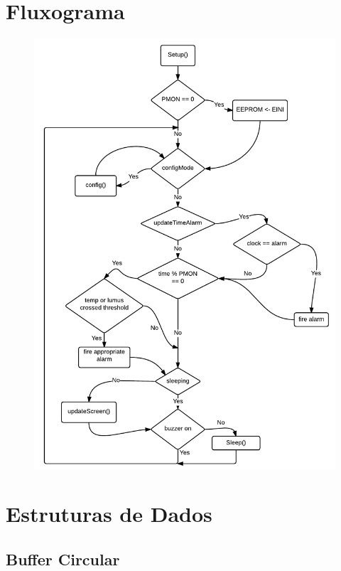 \documentclass[a4paper,12pt]{article}
\begin{document}
	

	\tableofcontents
	\pagebreak
	

\section{Fluxograma}



\begin{figure}[H]
\centering
\includegraphics[width=.9\textwidth]{img/flowchart.pdf}
\end{figure}

\pagebreak

\section{Estruturas de Dados}

\subsection{Buffer Circular}
\end{document}
